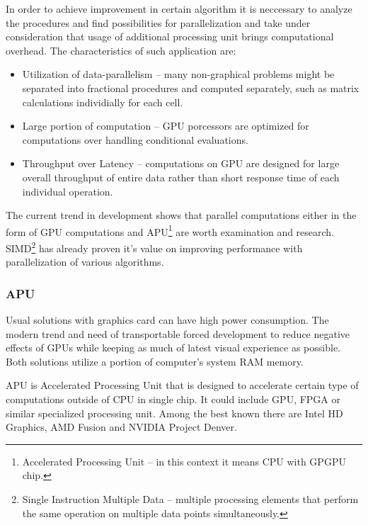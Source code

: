 In order to achieve improvement in certain algorithm it is neccessary to analyze
the procedures and find possibilities for parallelization and take under 
consideration that usage of additional processing unit brings computational 
overhead. The characteristics of such application are\cite{Owens:2008:GC}:

\begin{itemize}
\item Utilization of data-parallelism -- many non-graphical problems might be
separated into fractional procedures and computed separately, such as matrix 
calculations individially for each cell.
\item Large portion of computation -- GPU porcessors are optimized for 
computations over handling conditional evaluations.
\item Throughput over Latency -- computations on GPU are designed for large
overall throughput of entire data rather than short response time of each 
individual operation.
\end{itemize}

The current trend in development shows that parallel computations either in the
form of GPU computations and APU\footnote{ Accelerated Processing Unit -- 
in this context it means CPU with GPGPU chip.} are
worth examination and research. SIMD\footnote{ Single Instruction Multiple Data 
-- multiple processing elements that perform the same operation on multiple data 
points simultaneously\cite{Flynn:1972}.} has already proven it's value on 
improving performance with parallelization of various 
algorithms\cite{nvidia:sample, amd:apps}.

%





\subsubsection*{APU}
Usual solutions with graphics card can have high power consumption. The modern
trend and need of transportable forced development to reduce negative 
effects of GPUs while keeping as much of latest visual experience as 
possible\cite{apu:efficiency}.
Both solutions utilize a portion of computer's system RAM memory.

APU is Accelerated Processing Unit that is designed to accelerate certain
type of computations outside of CPU in single chip\cite{wiki:apu}. It could 
include GPU, FPGA or similar specialized processing unit. Among the best known 
there are Intel HD Graphics\cite{intel:apu}, AMD Fusion\cite{amd:apu} and NVIDIA 
Project Denver\cite{nvidia:apu}.

